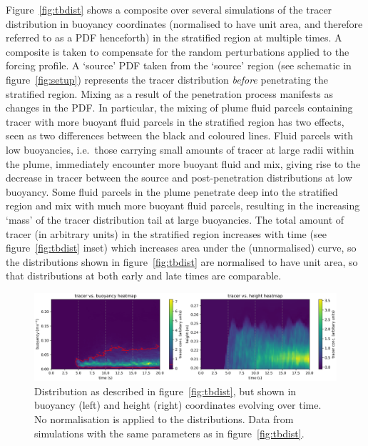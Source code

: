 \documentclass[a4paper]{article}
\begin{document}
Figure~\ref{fig:tbdist} shows a composite over several simulations of the tracer distribution in buoyancy
coordinates (normalised to have unit area, and therefore referred to as a PDF henceforth) in the stratified
region at multiple times. A composite is taken to compensate for the random perturbations applied to the
forcing profile. A `source' PDF taken from the `source' region (see schematic in figure~\ref{fig:setup})
represents the tracer distribution \emph{before} penetrating the stratified region.  Mixing as a result of the
penetration process manifests as changes in the PDF. In particular, the mixing of plume fluid parcels
containing tracer with more buoyant fluid parcels in the stratified region has two effects, seen as two
differences between the black and coloured lines. Fluid parcels with low buoyancies, i.e.\ those carrying
small amounts of tracer at large radii within the plume, immediately encounter more buoyant fluid and mix,
giving rise to the decrease in tracer between the source and post-penetration distributions at low buoyancy.
Some fluid parcels in the plume penetrate deep into the stratified region and mix with much more buoyant fluid
parcels, resulting in the increasing `mass' of the tracer distribution tail at large buoyancies.  The total
amount of tracer (in arbitrary units) in the stratified region increases with time (see
figure~\ref{fig:tbdist} inset) which increases area under the (unnormalised) curve, so the distributions shown
in figure~\ref{fig:tbdist} are normalised to have unit area, so that distributions at both early and late
times are comparable.

\begin{figure}
	\centering
	\includegraphics[width=\textwidth]{hmap}
	\caption{Distribution as described in figure~\ref{fig:tbdist}, but shown in buoyancy (left) and height
		(right) coordinates evolving over time. No normalisation is applied to the distributions. Data from
		simulations with the same parameters as in figure~\ref{fig:tbdist}.} 
	\label{fig:hmap}
\end{figure}
\end{document}
